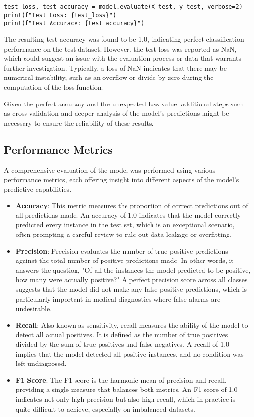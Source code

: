 \documentclass{report}
\begin{document}
\begin{verbatim}
test_loss, test_accuracy = model.evaluate(X_test, y_test, verbose=2)
print(f"Test Loss: {test_loss}")
print(f"Test Accuracy: {test_accuracy}")
\end{verbatim}

The resulting test accuracy was found to be 1.0, indicating perfect classification performance on the test dataset. However, the test loss was reported as NaN, which could suggest an issue with the evaluation process or data that warrants further investigation. Typically, a loss of NaN indicates that there may be numerical instability, such as an overflow or divide by zero during the computation of the loss function.

Given the perfect accuracy and the unexpected loss value, additional steps such as cross-validation and deeper analysis of the model's predictions might be necessary to ensure the reliability of these results.

\subsection{Performance Metrics}

A comprehensive evaluation of the model was performed using various performance metrics, each offering insight into different aspects of the model's predictive capabilities.

\begin{itemize}
    \item \textbf{Accuracy}: This metric measures the proportion of correct predictions out of all predictions made. An accuracy of 1.0 indicates that the model correctly predicted every instance in the test set, which is an exceptional scenario, often prompting a careful review to rule out data leakage or overfitting.
    
    \item \textbf{Precision}: Precision evaluates the number of true positive predictions against the total number of positive predictions made. In other words, it answers the question, "Of all the instances the model predicted to be positive, how many were actually positive?" A perfect precision score across all classes suggests that the model did not make any false positive predictions, which is particularly important in medical diagnostics where false alarms are undesirable.
    
    \item \textbf{Recall}: Also known as sensitivity, recall measures the ability of the model to detect all actual positives. It is defined as the number of true positives divided by the sum of true positives and false negatives. A recall of 1.0 implies that the model detected all positive instances, and no condition was left undiagnosed.
    
    \item \textbf{F1 Score}: The F1 score is the harmonic mean of precision and recall, providing a single measure that balances both metrics. An F1 score of 1.0 indicates not only high precision but also high recall, which in practice is quite difficult to achieve, especially on imbalanced datasets.
\end{itemize}
\end{document}
